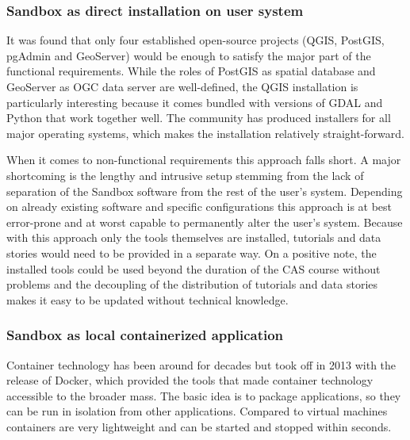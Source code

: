 \documentclass[11pt, a4paper, oneside, parskip=full-]{scrartcl}
\begin{document}
\subsubsection*{Sandbox as direct installation on user system}
It was found that only four established open-source projects (QGIS\cite{qgis},
PostGIS\cite{postgis}, pgAdmin\cite{pgadmin} and GeoServer\cite{geoserver})
would be enough to satisfy the major part of the functional requirements. While
the roles of PostGIS as spatial database and GeoServer as OGC data server are
well-defined, the QGIS installation is particularly interesting because it comes
bundled with versions of GDAL and Python that work together well. The community
has produced installers for all major operating systems, which makes the
installation relatively straight-forward.

When it comes to non-functional requirements this approach falls short. A major
shortcoming is the lengthy and intrusive setup stemming from the lack of
separation of the Sandbox software from the rest of the user's system. Depending
on already existing software and specific configurations this approach is at
best error-prone and at worst capable to permanently alter the user's system.
Because with this approach only the tools themselves are installed, tutorials
and data stories would need to be provided in a separate way. On a positive
note, the installed tools could be used beyond the duration of the CAS course
without problems and the decoupling of the distribution of tutorials and data
stories makes it easy to be updated without technical knowledge.

\subsubsection*{Sandbox as local containerized application}
Container technology has been around for decades but took off in 2013 with the
release of Docker, which provided the tools that made container technology
accessible to the broader mass. The basic idea is to package applications, so
they can be run in isolation from other applications. Compared to virtual
machines containers are very lightweight and can be started and stopped within
seconds.
\end{document}
